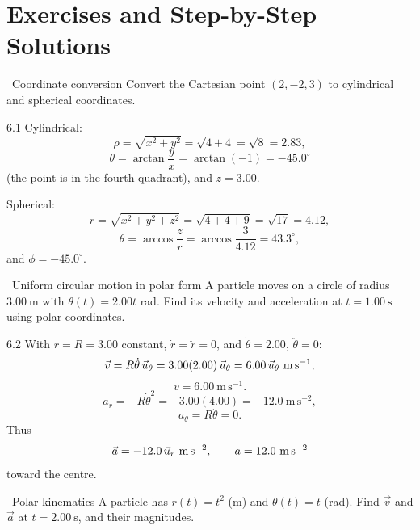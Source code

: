 \section{Exercises and Step-by-Step Solutions}

\begin{exercise}{\warm\ Coordinate conversion}
Convert the Cartesian point $(2,-2,3)$ to cylindrical and spherical coordinates.
\end{exercise}

\begin{tabletworkspace}[6.5cm]
\end{tabletworkspace}

\begin{solution}{6.1}
Cylindrical:
\[
\rho=\sqrt{x^2+y^2}=\sqrt{4+4}=\sqrt8=2.83,
\]
\[
\theta=\arctan\frac{y}{x}=\arctan(-1)=-45.0^\circ
\]
(the point is in the fourth quadrant), and $z=3.00$.

Spherical:
\[
r=\sqrt{x^2+y^2+z^2}=\sqrt{4+4+9}=\sqrt{17}=4.12,
\]
\[
\theta=\arccos\frac{z}{r}=\arccos\frac{3}{4.12}=43.3^\circ,
\]
and $\phi=-45.0^\circ$.
\end{solution}

\begin{exercise}{\warm\ Uniform circular motion in polar form}
A particle moves on a circle of radius $3.00\ \mathrm{m}$ with
$\theta(t)=2.00t$ rad. Find its velocity and acceleration at
$t=1.00\ \mathrm{s}$ using polar coordinates.
\end{exercise}

\begin{tabletworkspace}[6.5cm]
\end{tabletworkspace}

\begin{solution}{6.2}
With $r=R=3.00$ constant, $\dot r=\ddot r=0$, and
$\dot\theta=2.00$, $\ddot\theta=0$:
\[
\vec v=R\dot\theta\,\ut=3.00(2.00)\,\ut=6.00\,\ut\ \mathrm{m\,s^{-1}},
\]
\[
v=6.00\ \mathrm{m\,s^{-1}}.
\]
\[
a_r=-R\dot\theta^2=-3.00(4.00)=-12.0\ \mathrm{m\,s^{-2}},
\]
\[
a_\theta=R\ddot\theta=0.
\]
Thus
\[
\vec a=-12.0\,\vec{u}_r\ \mathrm{m\,s^{-2}},
\qquad a=12.0\ \mathrm{m\,s^{-2}}
\]
toward the centre.
\end{solution}

\begin{exercise}{\warm\ Polar kinematics}
A particle has $r(t)=t^2$ (m) and $\theta(t)=t$ (rad). Find $\vec v$ and
$\vec a$ at $t=2.00\ \mathrm{s}$, and their magnitudes.
\end{exercise}

